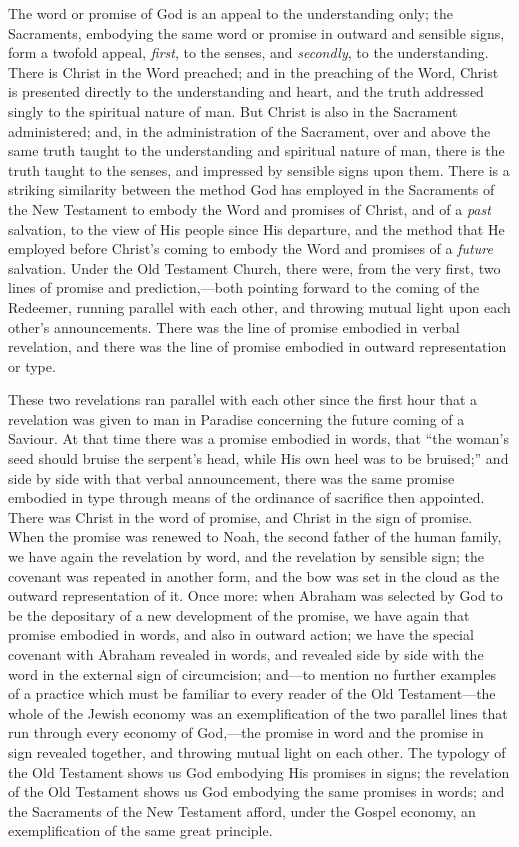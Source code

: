 \documentclass[
]{book}
\begin{document}
The word or promise of God is an appeal to the understanding only; the Sacraments, embodying the same word or promise in outward and sensible signs, form a twofold appeal, \emph{first}, to the senses, and \emph{secondly}, to the understanding. There is Christ in the Word preached; and in the preaching of the Word, Christ is presented directly to the understanding and heart, and the truth addressed singly to the spiritual nature of man. But Christ is also in the Sacrament administered; and, in the administration of the Sacrament, over and above the same truth taught to the understanding and spiritual nature of man, there is the truth taught to the senses, and impressed by sensible signs upon them. There is a striking similarity between the method God has employed in the Sacraments of the New Testament to embody the Word and promises of Christ, and of a \emph{past} salvation, to the view of His people since His departure, and the method that He employed before Christ's coming to embody the Word and promises of a \emph{future} salvation. Under the Old Testament Church, there were, from the very first, two lines of promise and prediction,---both pointing forward to the coming of the Redeemer, running parallel with each other, and throwing mutual light upon each other's announcements. There was the line of promise embodied in verbal revelation, and there was the line of promise embodied in outward representation or type.

These two revelations ran parallel with each other since the first hour that a revelation was given to man in Paradise concerning the future coming of a Saviour. At that time there was a promise embodied in words, that ``the woman's seed should bruise the serpent's head, while His own heel was to be bruised;'' and side by side with that verbal announcement, there was the same promise embodied in type through means of the ordinance of sacrifice then appointed. There was Christ in the word of promise, and Christ in the sign of promise. When the promise was renewed to Noah, the second father of the human family, we have again the revelation by word, and the revelation by sensible sign; the covenant was repeated in another form, and the bow was set in the cloud as the outward representation of it. Once more: when Abraham was selected by God to be the depositary of a new development of the promise, we have again that promise embodied in words, and also in outward action; we have the special covenant with Abraham revealed in words, and revealed side by side with the word in the external sign of circumcision; and---to mention no further examples of a practice which must be familiar to every reader of the Old Testament---the whole of the Jewish economy was an exemplification of the two parallel lines that run through every economy of God,---the promise in word and the promise in sign revealed together, and throwing mutual light on each other. The typology of the Old Testament shows us God embodying His promises in signs; the revelation of the Old Testament shows us God embodying the same promises in words; and the Sacraments of the New Testament afford, under the Gospel economy, an exemplification of the same great principle.
\end{document}
